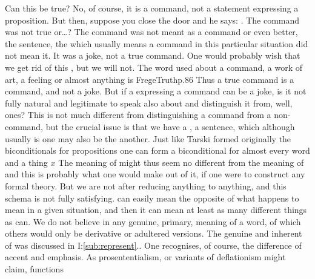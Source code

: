  \pa\label{pa:whatcanbetrue}  Can this be true?  No, of course, it is a command, not a statement
expressing a proposition. But then, suppose you close the door and he says:
. The command was not true
or\ldots? The command was not meant as a command or even better, the sentence,
the  which usually means a command in this particular situation did not
mean it. It was a joke, not a true command. One would probably wish that we get
rid of this , but we will not. The word  used about a command,
a work of art, a feeling or almost anything is \citet{put in front of another
  word in order to show that this word is to be understood in its proper,
  unadulterated sense.}{FregeTruth}{p.86} Thus a true command is a command, and
not a joke.  But if a  expressing a command can be a joke, is it not
fully natural and legitimate to speak also about  and
distinguish it from, well,  ones? This is not much different from
distinguishing a command from a non-command, but the crucial issue is that we
have a , a sentence, which although usually is one may also be the
another. Just like Tarski formed originally the biconditionals for propositions
%
%
one can form a biconditional for almost every word and a thing $x$
The meaning of  might thus seem no different from the meaning of
 and this is probably what one would make out of it, if one were to
construct any formal theory.
But we are not after reducing anything to anything, and this schema is not fully
satisfying.  can easily mean the opposite of what 
happens to mean in a given situation, and then it can mean at least as many
different things as  can. We do not believe in any genuine, primary,
 meaning of a word, of which others would only be derivative or
adultered versions. The genuine and inherent  of  was
discussed in I:\ref{sub:represent}..  One
recognises, of course, the difference of accent and emphasis. As
prosententialism, or variants of deflationism might claim,  functions
